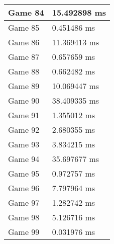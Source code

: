 \begin{tabular}{|l|l|}
	Game 84 & 15.492898 ms \\ \hline
	Game 85 & 0.451486 ms \\ \hline
	Game 86 & 11.369413 ms \\ \hline
	Game 87 & 0.657659 ms \\ \hline
	Game 88 & 0.662482 ms \\ \hline
	Game 89 & 10.069447 ms \\ \hline
	Game 90 & 38.409335 ms \\ \hline
	Game 91 & 1.355012 ms \\ \hline
	Game 92 & 2.680355 ms \\ \hline
	Game 93 & 3.834215 ms \\ \hline
	Game 94 & 35.697677 ms \\ \hline
	Game 95 & 0.972757 ms \\ \hline
	Game 96 & 7.797964 ms \\ \hline
	Game 97 & 1.282742 ms \\ \hline
	Game 98 & 5.126716 ms \\ \hline
	Game 99 & 0.031976 ms \\ \hline
\end{tabular}
